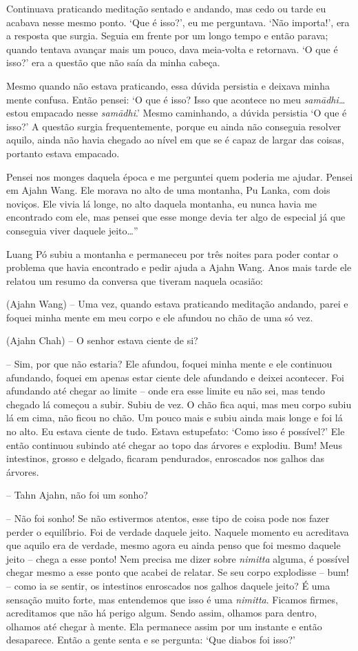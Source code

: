Continuava praticando meditação sentado e andando, mas cedo ou tarde eu
acabava nesse mesmo ponto. `Que é isso?', eu me perguntava. `Não
importa!', era a resposta que surgia. Seguia em frente por um longo
tempo e então parava; quando tentava avançar mais um pouco, dava
meia-volta e retornava. `O que é isso?' era a questão que não saía da
minha cabeça.

Mesmo quando não estava praticando, essa dúvida persistia e deixava
minha mente confusa. Então pensei: `O que é isso? Isso que acontece no
meu \emph{samādhi\ldots{}} estou empacado nesse \emph{samādhi}.' Mesmo
caminhando, a dúvida persistia `O que é isso?' A questão surgia
frequentemente, porque eu ainda não conseguia resolver aquilo, ainda não
havia chegado ao nível em que se é capaz de largar das coisas, portanto
estava empacado.

Pensei nos monges daquela época e me perguntei quem poderia me ajudar.
Pensei em Ajahn Wang. Ele morava no alto de uma montanha, Pu Lanka, com
dois noviços. Ele vivia lá longe, no alto daquela montanha, eu nunca
havia me encontrado com ele, mas pensei que esse monge devia ter algo de
especial já que conseguia viver daquele jeito\ldots{}''

Luang Pó subiu a montanha e permaneceu por três noites para poder contar
o problema que havia encontrado e pedir ajuda a Ajahn Wang. Anos mais
tarde ele relatou um resumo da conversa que tiveram naquela ocasião:

(Ajahn Wang) -- Uma vez, quando estava praticando meditação andando,
parei e foquei minha mente em meu corpo e ele afundou no chão de uma só
vez.

(Ajahn Chah) -- O senhor estava ciente de si?

-- Sim, por que não estaria? Ele afundou, foquei minha mente e ele
continuou afundando, foquei em apenas estar ciente dele afundando e
deixei acontecer. Foi afundando até chegar ao limite -- onde era esse
limite eu não sei, mas tendo chegado lá começou a subir. Subiu de vez. O
chão fica aqui, mas meu corpo subiu lá em cima, não ficou no chão. Um
pouco mais e subiu ainda mais longe e foi lá no alto. Eu estava ciente
de tudo. Estava estupefato: `Como isso é possível?' Ele então continuou
subindo até chegar ao topo das árvores e explodiu. Bum! Meus intestinos,
grosso e delgado, ficaram pendurados, enroscados nos galhos das árvores.

-- Tahn Ajahn, não foi um sonho?

-- Não foi sonho! Se não estivermos atentos, esse tipo de coisa pode nos
fazer perder o equilíbrio. Foi de verdade daquele jeito. Naquele momento
eu acreditava que aquilo era de verdade, mesmo agora eu ainda penso que
foi mesmo daquele jeito -- chega a esse ponto! Nem precisa me dizer
sobre \emph{nimitta} alguma, é possível chegar mesmo a esse ponto que
acabei de relatar. Se seu corpo explodisse -- bum! -- como ia se sentir,
os intestinos enroscados nos galhos daquele jeito? É uma sensação muito
forte, mas entendemos que isso é uma \emph{nimitta}. Ficamos firmes,
acreditamos que não há perigo algum. Sendo assim, olhamos para dentro,
olhamos até chegar à mente. Ela permanece assim por um instante e então
desaparece. Então a gente senta e se pergunta: `Que diabos foi isso?'

